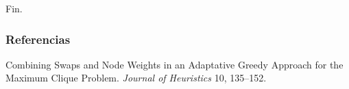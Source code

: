 \documentclass{beamer}
\begin{document}

\begin{frame}
\Huge{\centerline{Fin.}}
\end{frame}



\begin{frame}
\frametitle{Referencias}
\footnotesize{
  \begin{thebibliography}{99} %

      \newblock Combining Swaps and Node Weights in an Adaptative Greedy Approach for the Maximum Clique Problem.
      \newblock \emph{Journal of Heuristics} 10, 135--152.


  \end{thebibliography}
}
\end{frame}



\end{document}
